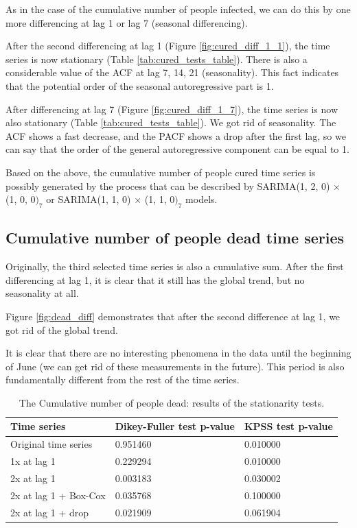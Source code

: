 As in the case of the cumulative number of people infected, we can do this by one more differencing at lag 1 or lag 7 (seasonal differencing).

After the second differencing at lag 1 (Figure \ref{fig:cured_diff_1_1}), the time series is now stationary (Table \ref{tab:cured_tests_table}). There is also a considerable value of the ACF at lag 7, 14, 21 (seasonality). This fact indicates that the potential order of the seasonal autoregressive part is 1.

After differencing at lag 7 (Figure \ref{fig:cured_diff_1_7}), the time series is now also stationary (Table \ref{tab:cured_tests_table}). We got rid of seasonality. The ACF shows a fast decrease, and the PACF shows a drop after the first lag, so we can say that the order of the general autoregressive component can be equal to 1. 

Based on the above, the cumulative number of people cured time series is possibly generated by the process that can be described by SARIMA(1, 2, 0) $\times$ (1, 0, 0$)_7$ or SARIMA(1, 1, 0) $\times$ (1, 1, 0$)_7$ models.

\subsection{Cumulative number of people dead time series}

Originally, the third selected time series is also a cumulative sum. After the first differencing at lag 1, it is clear that it still has the global trend, but no seasonality at all. 

Figure \ref{fig:dead_diff} demonstrates that after the second difference at lag 1, we got rid of the global trend. 

It is clear that there are no interesting phenomena in the data until the beginning of June (we can get rid of these measurements in the future). This period is also fundamentally different from the rest of the time series.

\begin{table}[!ht]
    \centering
    \begin{tabular}{|p{3cm}||p{3cm}| p{3cm}|}
    \hline
    Time series & Dikey-Fuller test p-value & KPSS test p-value\\
    \hline
    Original time series& 0.951460 & 0.010000\\
	\hline
	1x at lag 1 & 0.229294 & 0.010000\\
	\hline
	2x at lag 1 &  0.003183 & 0.030002\\
	\hline
	2x at lag 1 + Box-Cox &  0.035768 & 0.100000\\
	\hline
	2x at lag 1 + drop &  0.021909 & 0.061904\\
 \hline
\end{tabular}
    \caption{The Cumulative number of people dead: results of the stationarity tests.}
    \label{tab:dead_tests_table}
\end{table}

